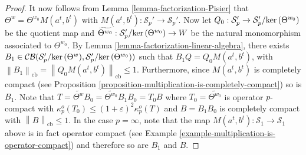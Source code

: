 \documentclass[11pt]{amsart}
\DeclareMathOperator{\cb}{cb}
\DeclareMathOperator{\CB}{\mathcal{CB}}
\newcommand{\n}[1]{ \left\|#1\right\| }
\numberwithin{equation}{section}
\def\ker{{\rm ker\, }}
\begin{document}
\begin{proof}
It now follows from Lemma \ref{lemma-factorization-Pisier} that $\Theta^w = \Theta^{w_0} M(a^t,b^t)$ with $M(a^t,b^t) : \mathcal{S}_p' \to \mathcal{S}_p'$. Now let $Q_0 : \mathcal{S}_p' \to \mathcal{S}_p'/\ker(\Theta^{w_0})$ be the quotient map and $\widetilde{\Theta^{w_0}} : \mathcal{S}_{p}'/\ker(\Theta^{w_0}) \to W$ be the natural monomorphism associated to $\Theta^{w_0}$.
By Lemma \ref{lemma-factorization-linear-algebra}, there exists $B_1 \in\CB(\mathcal{S}_p'/\ker(\Theta^w), \mathcal{S}_p'/\ker(\Theta^{w_0}))$ such that $B_1 Q = Q_0M(a^t,b^t)$, with $\n{B_1}_{\cb} = \n{Q_0M(a^t,b^t)}_{\cb} \le 1$.
Furthermore, since $M(a^t,b^t)$ is completely compact (see Proposition \ref{proposition-multiplication-is-completely-compact}) so is $B_1$.
Note that
$T =  \widetilde{\Theta^w} B_0 = \widetilde{\Theta^{w_0}}B_1B_0 = T_0 B$
where $T_0 =\widetilde{\Theta^{w_0}}$ is operator $p$-compact with $\kappa_p^o(T_0) \le (1+\varepsilon)^2\kappa^o_p(T)$ and $B = B_1B_0$ is completely compact with $\n{B}_{\cb} \le 1$.
In the case $p=\infty$, note that the map $M(a^t,b^t) : \mathcal{S}_1 \to \mathcal{S}_1$ above is in fact operator compact (see Example \ref{example-multiplication-is-operator-compact}) and therefore so are $B_1$ and $B$.


\end{proof}
\end{document}
